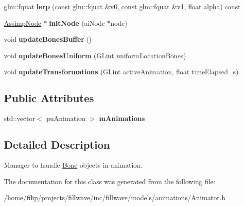 \begin{DoxyCompactItemize}
\item 
\mbox{\label{classflw_1_1flf_1_1Animator_ae79a22cd5e4481c2a059450fcd6e8368}} 
glm\+::fquat {\bfseries lerp} (const glm\+::fquat \&v0, const glm\+::fquat \&v1, float alpha) const
\item 
\mbox{\label{classflw_1_1flf_1_1Animator_af5218d1feba253d783ad3b794a68ff85}} 
\hyperlink{classflw_1_1flf_1_1AssimpNode}{Assimp\+Node} $\ast$ {\bfseries init\+Node} (ai\+Node $\ast$node)
\item 
\mbox{\label{classflw_1_1flf_1_1Animator_a3ecba35ad6f5d30f958a53562a92a41c}} 
void {\bfseries update\+Bones\+Buffer} ()
\item 
\mbox{\label{classflw_1_1flf_1_1Animator_a6f0bd0a4cccade30d741db48db75b01e}} 
void {\bfseries update\+Bones\+Uniform} (G\+Lint uniform\+Location\+Bones)
\item 
\mbox{\label{classflw_1_1flf_1_1Animator_ab630434c25ceb4dabc33cae6c4ed33cd}} 
void {\bfseries update\+Transformations} (G\+Lint active\+Animation, float time\+Elapsed\+\_\+s)
\end{DoxyCompactItemize}
\subsection*{Public Attributes}
\begin{DoxyCompactItemize}
\item 
\mbox{\label{classflw_1_1flf_1_1Animator_a8a7d0006b90e014259c0c8ff2c1a5055}} 
std\+::vector$<$ pu\+Animation $>$ {\bfseries m\+Animations}
\end{DoxyCompactItemize}


\subsection{Detailed Description}
Manager to handle \hyperlink{classflw_1_1flf_1_1Bone}{Bone} objects in animation. 

The documentation for this class was generated from the following file\+:\begin{DoxyCompactItemize}
\item 
/home/filip/projects/fillwave/inc/fillwave/models/animations/Animator.\+h\end{DoxyCompactItemize}
